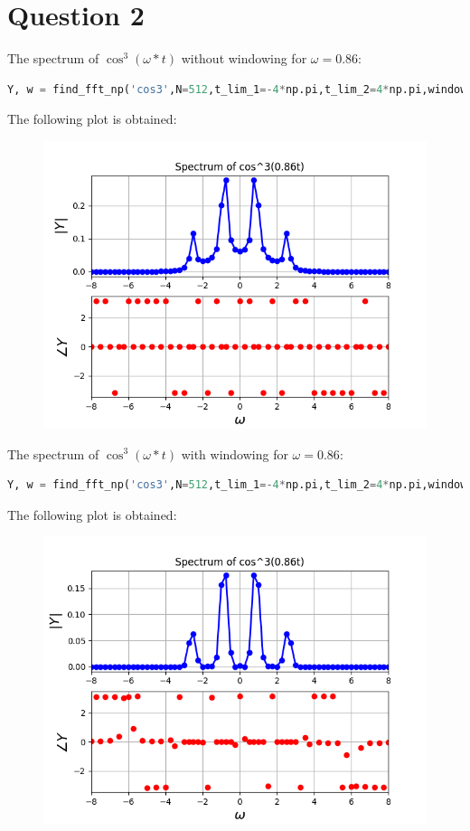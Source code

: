 \documentclass[11pt, a4paper]{article}
\begin{document}
\section{Question 2}
The spectrum of $\cos^3(\omega*t)$ without windowing for $\omega = 0.86$:
\begin{lstlisting}[language = Python]
Y, w = find_fft_np('cos3',N=512,t_lim_1=-4*np.pi,t_lim_2=4*np.pi,windowing=False)

\end{lstlisting}
The following plot is obtained:
\begin{figure}[H]
     \centering
     \includegraphics[scale=0.8]{Figure_4.png}
\end{figure}

The spectrum of $\cos^3(\omega*t)$ with windowing for $\omega = 0.86$:
\begin{lstlisting}[language = Python]
Y, w = find_fft_np('cos3',N=512,t_lim_1=-4*np.pi,t_lim_2=4*np.pi,windowing=True)

\end{lstlisting}
The following plot is obtained:
\begin{figure}[H]
     \centering
     \includegraphics[scale=0.8]{Figure_5.png}
\end{figure}
\end{document}
